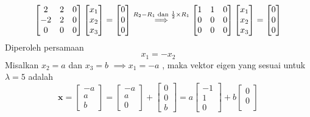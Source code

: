 \documentclass[12pt,A4paper]{article}
\begin{document}
\begin{enumerate}
\begin{enumerate}
\begin{itemize}
        \begin{eqnarray*}\begin{bmatrix}
2 & 2 & 0 \\
-2 & 2 & 0 \\
0 & 0 & 0
\end{bmatrix}  \begin{bmatrix}
x_1 \\
x_2 \\
x_3
\end{bmatrix} = \begin{bmatrix}
0 \\
 0\\
0
\end{bmatrix} \buildrel R_2 - R_1 \text{ dan } \frac{1}{2} \times R_1 \over  \implies \begin{bmatrix}
1 & 1 & 0 \\
0 & 0 & 0 \\
0 & 0 & 0
\end{bmatrix}  \begin{bmatrix}
x_1 \\
x_2 \\
x_3
\end{bmatrix} = \begin{bmatrix}
0 \\
 0\\
0
\end{bmatrix}
\end{eqnarray*}
Diperoleh persamaan
\[ x_1 = -x_2 \]
Misalkan $x_2 = a$ dan $x_3 = b$ $\implies x_1 = -a$ , maka vektor eigen yang sesuai untuk $\lambda = 5$ adalah
\[\mathbf{x} = \begin{bmatrix}
-a \\
a\\
b
\end{bmatrix} = 
\begin{bmatrix}
-a \\
a\\
0
\end{bmatrix} + \begin{bmatrix}
0 \\
0\\
b
\end{bmatrix} = a \begin{bmatrix}
-1 \\
1\\
0
\end{bmatrix} + b\begin{bmatrix}
0 \\
0\\

\end{bmatrix}\]
\end{itemize}
\end{enumerate}
\end{enumerate}
\end{document}
